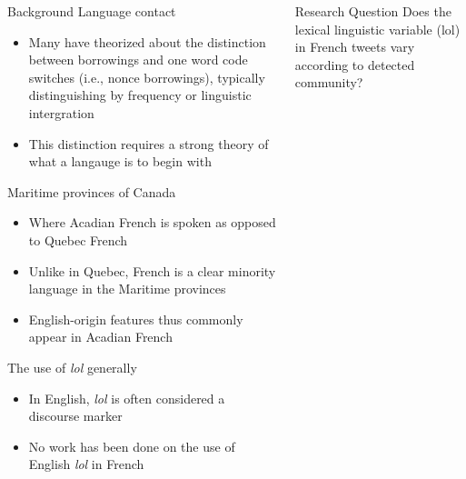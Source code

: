 \documentclass{beamer}\usepackage[]{graphicx}\usepackage[]{color}
\newcommand{\lexi}[1]{\textit{#1}}
\begin{document}
\begin{frame}
    \begin{columns}[t]
        \begin{block}{Background}
          Language contact
          \begin{itemize}
            \item Many have theorized about the distinction between borrowings and one word code switches (i.e., nonce borrowings), typically distinguishing by frequency or linguistic intergration \parencite{matras_language_2009, myers-scotton_code-switching_2000, poplack_sometimes_2000, poplack_social_1988}
            \item This distinction requires a strong theory of what a langauge is to begin with
          \end{itemize}
          Maritime provinces of Canada
          \begin{itemize}
            \item Where Acadian French is spoken as opposed to Quebec French \parencite{king_lexical_2000}
            \item Unlike in Quebec, French is a clear minority language in the Maritime provinces \parencite{comeau_window_2011, king_lexical_2000}
            \item English-origin features thus commonly appear in Acadian French \parencite{king_chiac_2008, perrot_trajet_2014}
          \end{itemize}
          The use of \lexi{lol} generally
          \begin{itemize}
            \item In English, \lexi{lol} is often considered a discourse marker \parencite{baron_see_2004, tagliamonte_linguistic_2008}
            \item No work has been done on the use of English \lexi{lol} in French
          \end{itemize}
        \end{block}

        \begin{block}{Research Question}
          Does the lexical linguistic variable (lol) in French tweets vary according to detected community?
        \end{block}


\end{columns}
\end{frame}
\end{document}
